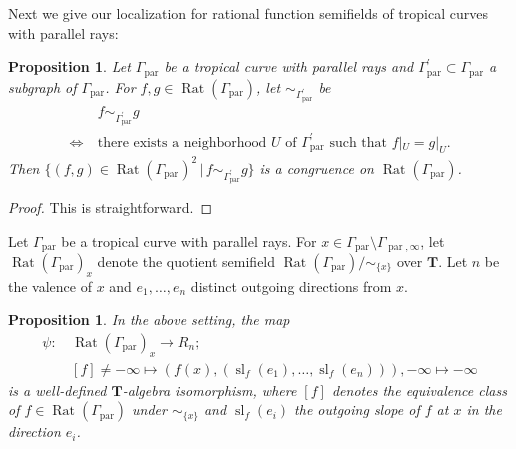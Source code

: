 \documentclass[a4paper,12pt]{amsart}
\newtheorem{prop}[dfn]{Proposition}
\def\Gamma{\varGamma}
\begin{document}
Next we give our localization for rational function semifields of tropical curves with parallel rays:

\begin{prop}
    \label{prop4-6-2}
Let $\Gamma_{\operatorname{par}}$ be a tropical curve with parallel rays and $\Gamma^{\prime}_{\operatorname{par}} \subset \Gamma_{\operatorname{par}}$ a subgraph of $\Gamma_{\operatorname{par}}$.
For $f, g \in \operatorname{Rat}(\Gamma_{\operatorname{par}})$, let $\sim_{\Gamma^{\prime}_{\operatorname{par}}}$ be
\begin{align*}
&~ f \sim_{\Gamma^{\prime}_{\operatorname{par}}} g\\
\Longleftrightarrow &~ \text{there exists a neighborhood }U \text{ of } \Gamma^{\prime}_{\operatorname{par}} \text{ such that } f|_U = g|_U.
\end{align*}
Then $\{ (f, g) \in \operatorname{Rat}(\Gamma_{\operatorname{par}})^2 \,|\,  f \sim_{\Gamma^{\prime}_{\operatorname{par}}} g \}$ is a congruence on $\operatorname{Rat}(\Gamma_{\operatorname{par}})$.
\end{prop}

\begin{proof}
This is straightforward.
\end{proof}

Let $\Gamma_{\operatorname{par}}$ be a tropical curve with parallel rays.
For $x \in \Gamma_{\operatorname{par}} \setminus \Gamma_{\operatorname{par}, \infty}$, let $\operatorname{Rat}(\Gamma_{\operatorname{par}})_x$ denote the quotient semifield $\operatorname{Rat}(\Gamma_{\operatorname{par}}) / \sim_{ \{x \}}$ over $\boldsymbol{T}$.
Let $n$ be the valence of $x$ and $e_1, \ldots, e_n$ distinct outgoing directions from $x$.

\begin{prop}
    \label{prop4-6-3}
In the above setting, the map
\begin{align*}
\psi :\, &\operatorname{Rat}(\Gamma_{\operatorname{par}})_x \to R_n;\\ &[f] \not= -\infty \mapsto (f(x), (\operatorname{sl}_f(e_1), \ldots, \operatorname{sl}_f(e_n))), -\infty \mapsto -\infty
\end{align*}
is a well-defined $\boldsymbol{T}$-algebra isomorphism, where $[f]$ denotes the equivalence class of $f \in \operatorname{Rat}(\Gamma_{\operatorname{par}})$ under $\sim_{ \{ x \} }$ and $\operatorname{sl}_f(e_i)$ the outgoing slope of $f$ at $x$ in the direction $e_i$.
\end{prop}
\end{document}
